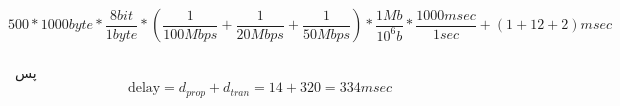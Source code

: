 \problem{}

\begin{equation*}
	500 * 1000 \unit{byte} * \frac{8 \unit {bit}}{1 \unit{byte}} * (\frac{ 1}{100 \unit{Mbps}} 
	+ \frac{1}{20 \unit{Mbps}} + \frac{1}{50 \unit{Mbps}}) * \frac{1 \unit{Mb}}{10^6 \unit{b}}  
	* \frac{1000 \unit{msec}}{1 \unit{sec}}  + (1+12+2) \unit{msec}
\end{equation*}
\\\
پس 
$$\text{delay} = d_{prop} + d_{tran} = 14 + 320 = 334 \unit{msec}$$

